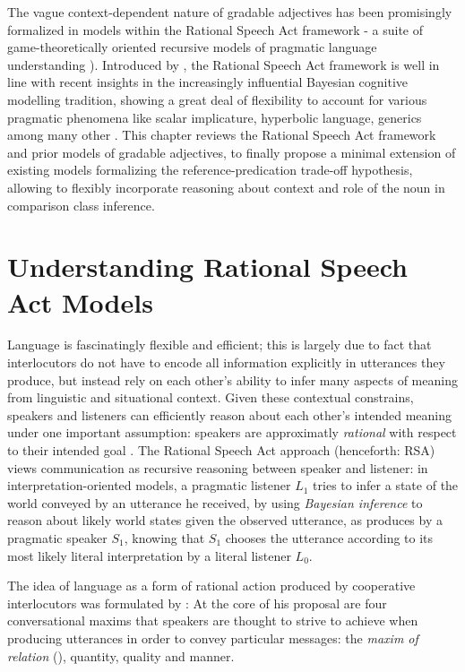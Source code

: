 The vague context-dependent nature of gradable adjectives has been promisingly formalized in models within the Rational Speech Act framework -  a suite of game-theoretically oriented recursive models of pragmatic language understanding \parencite{goodman2016, lassiter2017adjectival, tessler2017warm}). Introduced by \textcite{frank2012predicting}, the Rational Speech Act framework is well in line with recent insights in the increasingly influential Bayesian cognitive modelling tradition, showing a great deal of flexibility to account for various pragmatic phenomena like scalar implicature, hyperbolic language, generics among many other \parencite[e.g.,][]{tenenbaum2011grow, problang}. This chapter reviews the Rational Speech Act framework and prior models of gradable adjectives, to finally propose a minimal extension of existing models formalizing the reference-predication trade-off hypothesis, allowing to flexibly incorporate reasoning about context and role of the noun in comparison class inference. 
  
\section{Understanding Rational Speech Act Models}

Language is fascinatingly flexible and efficient; this is largely due to fact that interlocutors do not have to encode all information explicitly in utterances they produce, but instead rely on each other's ability to infer many aspects of meaning from linguistic and situational context. Given these contextual constrains, speakers and listeners can efficiently reason about each other's intended meaning under one important assumption: speakers are approximatly \emph{rational} with respect to their intended goal \parencite{frank2012predicting}. The Rational Speech Act approach (henceforth: RSA) views communication as recursive reasoning between speaker and listener: in interpretation-oriented models, a pragmatic listener $L_1$ tries to infer a state of the world conveyed by an utterance he received, by using \emph{Bayesian inference} to reason about likely world states given the observed utterance, as produces by a pragmatic speaker $S_1$, knowing that $S_1$ chooses the utterance according to its most likely literal interpretation by a literal listener $L_0$.  

The idea of language as a form of rational action produced by cooperative interlocutors was formulated by \textcite{grice1975logic}: At the core of his proposal are four conversational maxims that speakers are thought to strive to achieve when producing utterances in order to convey particular messages: the \emph{maxim of relation} (), quantity, quality and manner. 

